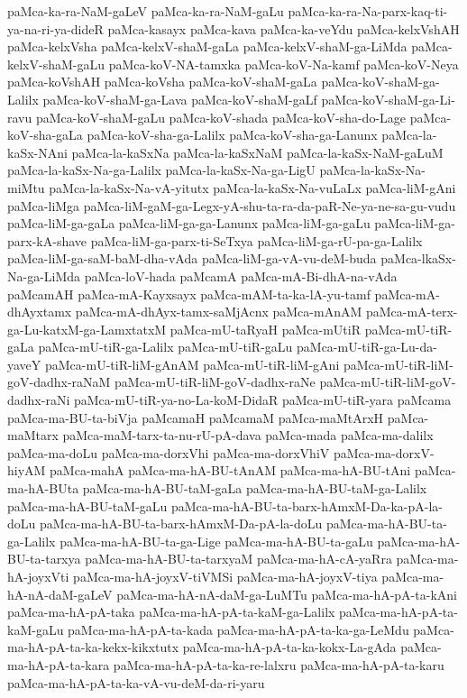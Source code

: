 {paMca-ka-ra-NaM-gaLeV
paMca-ka-ra-NaM-gaLu
paMca-ka-ra-Na-parx-kaq-ti-ya-na-ri-ya-dideR
paMca-kasayx
paMca-kava
paMca-ka-veYdu
paMca-kelxVshAH
paMca-kelxVsha
paMca-kelxV-shaM-gaLa
paMca-kelxV-shaM-ga-LiMda
paMca-kelxV-shaM-gaLu
paMca-koV-NA-tamxka
paMca-koV-Na-kamf
paMca-koV-Neya
paMca-koVshAH
paMca-koVsha
paMca-koV-shaM-gaLa
paMca-koV-shaM-ga-Lalilx
paMca-koV-shaM-ga-Lava
paMca-koV-shaM-gaLf
paMca-koV-shaM-ga-Li-ravu
paMca-koV-shaM-gaLu
paMca-koV-shada
paMca-koV-sha-do-Lage
paMca-koV-sha-gaLa
paMca-koV-sha-ga-Lalilx
paMca-koV-sha-ga-Lanunx
paMca-la-kaSx-NAni
paMca-la-kaSxNa
paMca-la-kaSxNaM
paMca-la-kaSx-NaM-gaLuM
paMca-la-kaSx-Na-ga-Lalilx
paMca-la-kaSx-Na-ga-LigU
paMca-la-kaSx-Na-miMtu
paMca-la-kaSx-Na-vA-yitutx
paMca-la-kaSx-Na-vuLaLx
paMca-liM-gAni
paMca-liMga
paMca-liM-gaM-ga-Legx-yA-shu-ta-ra-da-paR-Ne-ya-ne-sa-gu-vudu
paMca-liM-ga-gaLa
paMca-liM-ga-ga-Lanunx
paMca-liM-ga-gaLu
paMca-liM-ga-parx-kA-shave
paMca-liM-ga-parx-ti-SeTxya
paMca-liM-ga-rU-pa-ga-Lalilx
paMca-liM-ga-saM-baM-dha-vAda
paMca-liM-ga-vA-vu-deM-buda
paMca-lkaSx-Na-ga-LiMda
paMca-loV-hada
paMcamA
paMca-mA-Bi-dhA-na-vAda
paMcamAH
paMca-mA-Kayxsayx
paMca-mAM-ta-ka-lA-yu-tamf
paMca-mA-dhAyxtamx
paMca-mA-dhAyx-tamx-saMjAcnx
paMca-mAnAM
paMca-mA-terx-ga-Lu-katxM-ga-LamxtatxM
paMca-mU-taRyaH
paMca-mUtiR
paMca-mU-tiR-gaLa
paMca-mU-tiR-ga-Lalilx
paMca-mU-tiR-gaLu
paMca-mU-tiR-ga-Lu-da-yaveY
paMca-mU-tiR-liM-gAnAM
paMca-mU-tiR-liM-gAni
paMca-mU-tiR-liM-goV-dadhx-raNaM
paMca-mU-tiR-liM-goV-dadhx-raNe
paMca-mU-tiR-liM-goV-dadhx-raNi
paMca-mU-tiR-ya-no-La-koM-DidaR
paMca-mU-tiR-yara
paMcama
paMca-ma-BU-ta-biVja
paMcamaH
paMcamaM
paMca-maMtArxH
paMca-maMtarx
paMca-maM-tarx-ta-nu-rU-pA-dava
paMca-mada
paMca-ma-dalilx
paMca-ma-doLu
paMca-ma-dorxVhi
paMca-ma-dorxVhiV
paMca-ma-dorxV-hiyAM
paMca-mahA
paMca-ma-hA-BU-tAnAM
paMca-ma-hA-BU-tAni
paMca-ma-hA-BUta
paMca-ma-hA-BU-taM-gaLa
paMca-ma-hA-BU-taM-ga-Lalilx
paMca-ma-hA-BU-taM-gaLu
paMca-ma-hA-BU-ta-barx-hAmxM-Da-ka-pA-la-doLu
paMca-ma-hA-BU-ta-barx-hAmxM-Da-pA-la-doLu
paMca-ma-hA-BU-ta-ga-Lalilx
paMca-ma-hA-BU-ta-ga-Lige
paMca-ma-hA-BU-ta-gaLu
paMca-ma-hA-BU-ta-tarxya
paMca-ma-hA-BU-ta-tarxyaM
paMca-ma-hA-cA-yaRra
paMca-ma-hA-joyxVti
paMca-ma-hA-joyxV-tiVMSi
paMca-ma-hA-joyxV-tiya
paMca-ma-hA-nA-daM-gaLeV
paMca-ma-hA-nA-daM-ga-LuMTu
paMca-ma-hA-pA-ta-kAni
paMca-ma-hA-pA-taka
paMca-ma-hA-pA-ta-kaM-ga-Lalilx
paMca-ma-hA-pA-ta-kaM-gaLu
paMca-ma-hA-pA-ta-kada
paMca-ma-hA-pA-ta-ka-ga-LeMdu
paMca-ma-hA-pA-ta-ka-kekx-kikxtutx
paMca-ma-hA-pA-ta-ka-kokx-La-gAda
paMca-ma-hA-pA-ta-kara
paMca-ma-hA-pA-ta-ka-re-lalxru
paMca-ma-hA-pA-ta-karu
paMca-ma-hA-pA-ta-ka-vA-vu-deM-da-ri-yaru
}

